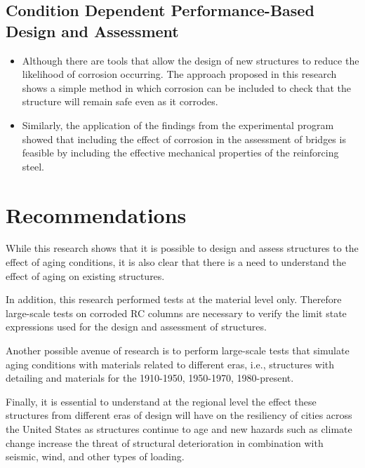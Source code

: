 \subsection{Condition Dependent Performance-Based Design and Assessment}
\begin{itemize}
    \item Although there are tools that allow the design of new structures to reduce the likelihood of corrosion occurring. The approach proposed in this research shows a simple method in which corrosion can be included to check that the structure will remain safe even as it corrodes.
    \item Similarly, the application of the findings from the experimental program showed that including the effect of corrosion in the assessment of bridges is feasible by including the effective mechanical properties of the reinforcing steel.
\end{itemize}

\section{Recommendations}

While this research shows that it is possible to design and assess structures to the effect of aging conditions, it is also clear that there is a need to understand the effect of aging on existing structures.

In addition, this research performed tests at the material level only. Therefore large-scale tests on corroded RC columns are necessary to verify the limit state expressions used for the design and assessment of structures. 

Another possible avenue of research is to perform large-scale tests that simulate aging conditions with materials related to different eras, i.e., structures with detailing and materials for the 1910-1950, 1950-1970, 1980-present. 

Finally, it is essential to understand at the regional level the effect these structures from different eras of design will have on the resiliency of cities across the United States as structures continue to age and new hazards such as climate change increase the threat of structural deterioration in combination with seismic, wind, and other types of loading.